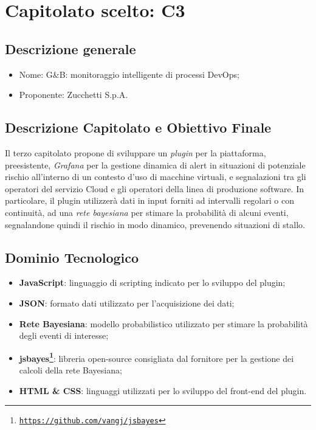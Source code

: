 \section{Capitolato scelto: C3}

\subsection{Descrizione generale}
\begin{itemize}
	\item Nome: G$\&$B: monitoraggio intelligente di processi DevOps;
	\item Proponente: Zucchetti S.p.A.
\end{itemize}

\subsection{Descrizione Capitolato e Obiettivo Finale}
Il terzo capitolato propone di sviluppare un \textit{plugin} per la piattaforma, preesistente, \textit{Grafana} per la gestione dinamica di alert in situazioni di potenziale rischio all'interno di un contesto d'uso di macchine virtuali, e segnalazioni tra gli operatori del servizio Cloud e gli operatori della linea di produzione software.
In particolare, il plugin  utilizzerà dati in input forniti ad intervalli regolari o con continuità, ad una \textit{rete bayesiana} per stimare la probabilità di alcuni eventi, segnalandone quindi il rischio in modo dinamico, prevenendo situazioni di stallo.

\subsection{Dominio Tecnologico}
\begin{itemize}
	\item \textbf{JavaScript}: linguaggio di scripting indicato per lo sviluppo del plugin;
	\item \textbf{JSON}: formato dati utilizzato per l'acquisizione dei dati;
	\item \textbf{Rete Bayesiana}: modello probabilistico utilizzato per stimare la probabilità degli eventi di interesse;
	\item \textbf{jsbayes\footnote{\hyperref[Link al repository GitHub]{\texttt{https://github.com/vangj/jsbayes}}}}: libreria open-source consigliata dal fornitore per la gestione dei calcoli della rete Bayesiana;
	\item \textbf{HTML \& CSS}: linguaggi utilizzati per lo sviluppo del front-end del plugin.
\end{itemize}

